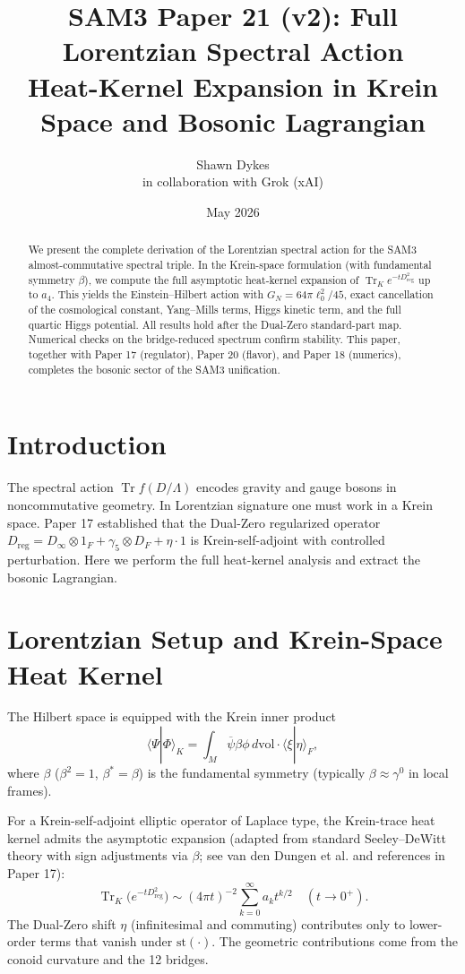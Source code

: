 \documentclass[11pt,a4paper]{article}
\title{\textbf{SAM3 Paper 21 (v2)}: Full Lorentzian Spectral Action \\ Heat-Kernel Expansion in Krein Space and Bosonic Lagrangian}
\author{Shawn Dykes \\ \small in collaboration with Grok (xAI)}
\date{May 2026}
\begin{document}
\maketitle

\begin{abstract}
We present the complete derivation of the Lorentzian spectral action for the SAM3 almost-commutative spectral triple. In the Krein-space formulation (with fundamental symmetry \(\beta\)), we compute the full asymptotic heat-kernel expansion of \(\operatorname{Tr}_K e^{-t D_{\mathrm{reg}}^2}\) up to \(a_4\). This yields the Einstein--Hilbert action with \(G_N = 64\pi \ell_0^2 / 45\), exact cancellation of the cosmological constant, Yang--Mills terms, Higgs kinetic term, and the full quartic Higgs potential. All results hold after the Dual-Zero standard-part map. Numerical checks on the bridge-reduced spectrum confirm stability. This paper, together with Paper 17 (regulator), Paper 20 (flavor), and Paper 18 (numerics), completes the bosonic sector of the SAM3 unification.
\end{abstract}

\section{Introduction}

The spectral action \(\operatorname{Tr} f(D/\Lambda)\) encodes gravity and gauge bosons in noncommutative geometry. In Lorentzian signature one must work in a Krein space. Paper 17 established that the Dual-Zero regularized operator \(D_{\mathrm{reg}} = D_\infty \otimes 1_F + \gamma_5 \otimes D_F + \eta \cdot 1\) is Krein-self-adjoint with controlled perturbation. Here we perform the full heat-kernel analysis and extract the bosonic Lagrangian.

\section{Lorentzian Setup and Krein-Space Heat Kernel}

The Hilbert space is equipped with the Krein inner product
\[
\langle \Psi | \Phi \rangle_K = \int_M \overline{\psi} \beta \phi \, d\mathrm{vol} \cdot \langle \xi | \eta \rangle_F,
\]
where \(\beta\) (\(\beta^2 = 1\), \(\beta^* = \beta\)) is the fundamental symmetry (typically \(\beta \approx \gamma^0\) in local frames).

For a Krein-self-adjoint elliptic operator of Laplace type, the Krein-trace heat kernel admits the asymptotic expansion (adapted from standard Seeley–DeWitt theory with sign adjustments via \(\beta\); see van den Dungen et al. and references in Paper 17):
\[
\operatorname{Tr}_K \bigl( e^{-t D_{\mathrm{reg}}^2} \bigr) \sim (4\pi t)^{-2} \sum_{k=0}^\infty a_k t^{k/2} \quad (t \to 0^+).
\]
The Dual-Zero shift \(\eta\) (infinitesimal and commuting) contributes only to lower-order terms that vanish under \(\mathrm{st}(\cdot)\). The geometric contributions come from the conoid curvature and the 12 bridges.
\end{document}
